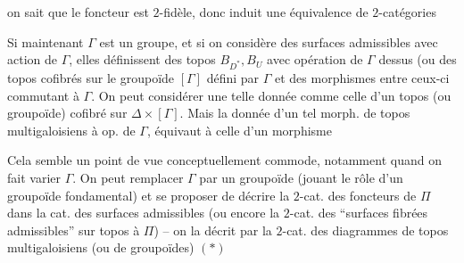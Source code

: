 on sait que le foncteur est $2$-fidèle, donc induit une équivalence de $2$-catégories

Si maintenant $\Gamma$ est un groupe, et si on considère des surfaces admissibles avec action de $\Gamma$, elles définissent des topos  $B_{D^*},B_U$ avec opération de $\Gamma$ dessus (ou des topos cofibrés sur le groupoïde $[\Gamma]$ défini par $\Gamma$\unsure{]|)} et des morphismes entre ceux-ci commutant à $\Gamma$. On peut considérer une telle donnée comme celle d'un topos  (ou groupoïde) cofibré sur $\Delta\times[\Gamma]$.   Mais la donnée d'un tel morph. de topos multigaloisiens à op. de $\Gamma$, équivaut à celle d'un morphisme 

Cela semble un point de vue conceptuellement commode, notamment quand on fait varier $\Gamma$. On peut remplacer $\Gamma$ par un groupoïde  \inserted{$\Pi$} (jouant le rôle d'un groupoïde fondamental) et se proposer de décrire la $2$-cat.  des foncteurs de $\Pi$ dans la cat. des surfaces admissibles (ou encore la $2$-cat. des ``surfaces fibrées admissibles'' sur  topos    à $\Pi$) -- on la décrit par la $2$-cat.  des  diagrammes de topos multigaloisiens (ou de groupoïdes)
$(*)$

